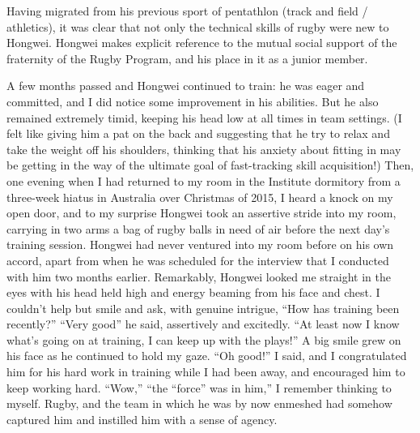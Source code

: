 Having migrated from his previous sport of pentathlon (track and field / athletics), it was clear that not only the technical skills of rugby were new to Hongwei.  Hongwei makes explicit reference to the mutual social support of the fraternity of the Rugby Program, and his place in it as a junior member.


A few months passed and Hongwei continued to train: he was eager and committed, and I did notice some improvement in his abilities. But he also remained extremely timid, keeping his head low at all times in team settings.  (I felt like giving him a pat on the back and suggesting that he try to relax and take the weight off his shoulders, thinking that his anxiety about fitting in may be getting in the way of the ultimate goal of fast-tracking skill acquisition!)  Then, one evening when I had returned to my room in the Institute dormitory from a three-week hiatus in Australia over Christmas of 2015, I heard a knock on my open door, and to my surprise Hongwei took an assertive stride into my room, carrying in two arms a bag of rugby balls in need of air before the next day's training session.  Hongwei had never ventured into my room before on his own accord, apart from when he was scheduled for the interview that I conducted with him two months earlier.  Remarkably, Hongwei looked me straight in the eyes with his head held high and energy beaming from his face and chest.  I couldn’t help but smile and ask, with genuine intrigue, ``How has training been recently?''
``Very good'' he said, assertively and excitedly.  ``At least now I know what’s going on at training, I can keep up with the plays!''  A big smile grew on his face as he continued to hold my gaze.  ``Oh good!'' I said, and I congratulated him for his hard work in training while I had been away, and encouraged him to keep working hard. ``Wow,'' ``the ``force'' was in him,'' I remember thinking to myself.  Rugby, and the team in which he was by now enmeshed had somehow captured him and instilled him with a sense of agency.

